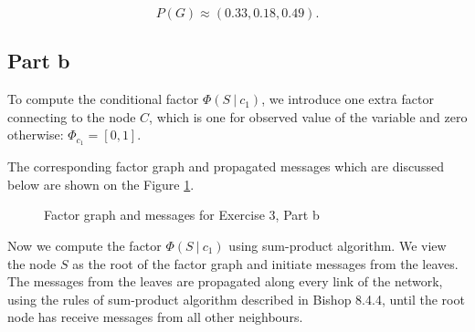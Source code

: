 \documentclass[11pt,a4paper]{article}
\begin{document}
	$$ P(G) \approx (0.33, 0.18, 0.49). $$
	
	
\subsection*{Part b}
	To compute the conditional factor $\Phi(S \ | \ c_1)$, we introduce one extra factor connecting to the node $C$, which is one for observed value of the variable and zero otherwise: $\Phi_{c_1} = [0, 1]. $
	
	
	The corresponding factor graph and propagated messages which are discussed below are shown on the Figure \ref{fig:fgraph_3b}.
	
	\begin{figure}[H]
		\caption{Factor graph and messages for Exercise 3, Part b}
		\label{fig:fgraph_3b}
	\end{figure}
	
	
	Now we compute the factor $\Phi(S \ | \ c_1)$ using sum-product algorithm. We view the node $S$ as the root of the factor graph and initiate messages from the leaves. The messages from the leaves are propagated along every link of the network, using the rules of sum-product algorithm described in Bishop 8.4.4, until the root node has receive messages from all other neighbours.
	
\end{document}
